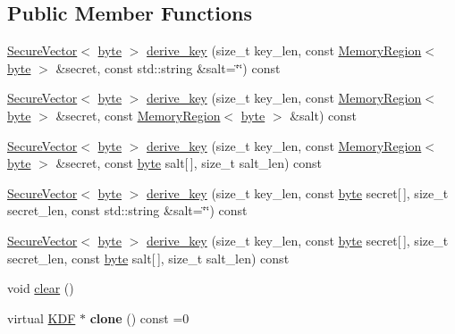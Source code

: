 \subsection*{Public Member Functions}
\begin{DoxyCompactItemize}
\item 
\hyperlink{classBotan_1_1SecureVector}{Secure\-Vector}$<$ \hyperlink{namespaceBotan_a7d793989d801281df48c6b19616b8b84}{byte} $>$ \hyperlink{classBotan_1_1KDF_aa3b8256bf5bd06641936c7509fdcbbd6}{derive\-\_\-key} (size\-\_\-t key\-\_\-len, const \hyperlink{classBotan_1_1MemoryRegion}{Memory\-Region}$<$ \hyperlink{namespaceBotan_a7d793989d801281df48c6b19616b8b84}{byte} $>$ \&secret, const std\-::string \&salt=\char`\"{}\char`\"{}) const 
\item 
\hyperlink{classBotan_1_1SecureVector}{Secure\-Vector}$<$ \hyperlink{namespaceBotan_a7d793989d801281df48c6b19616b8b84}{byte} $>$ \hyperlink{classBotan_1_1KDF_adb6a3e30d795dfe5296c3664c6dc6729}{derive\-\_\-key} (size\-\_\-t key\-\_\-len, const \hyperlink{classBotan_1_1MemoryRegion}{Memory\-Region}$<$ \hyperlink{namespaceBotan_a7d793989d801281df48c6b19616b8b84}{byte} $>$ \&secret, const \hyperlink{classBotan_1_1MemoryRegion}{Memory\-Region}$<$ \hyperlink{namespaceBotan_a7d793989d801281df48c6b19616b8b84}{byte} $>$ \&salt) const 
\item 
\hyperlink{classBotan_1_1SecureVector}{Secure\-Vector}$<$ \hyperlink{namespaceBotan_a7d793989d801281df48c6b19616b8b84}{byte} $>$ \hyperlink{classBotan_1_1KDF_a0c9663079752c839d6d83480c1f2ebf5}{derive\-\_\-key} (size\-\_\-t key\-\_\-len, const \hyperlink{classBotan_1_1MemoryRegion}{Memory\-Region}$<$ \hyperlink{namespaceBotan_a7d793989d801281df48c6b19616b8b84}{byte} $>$ \&secret, const \hyperlink{namespaceBotan_a7d793989d801281df48c6b19616b8b84}{byte} salt\mbox{[}$\,$\mbox{]}, size\-\_\-t salt\-\_\-len) const 
\item 
\hyperlink{classBotan_1_1SecureVector}{Secure\-Vector}$<$ \hyperlink{namespaceBotan_a7d793989d801281df48c6b19616b8b84}{byte} $>$ \hyperlink{classBotan_1_1KDF_ae5f9ef438932d55ba6cd23df12027a6b}{derive\-\_\-key} (size\-\_\-t key\-\_\-len, const \hyperlink{namespaceBotan_a7d793989d801281df48c6b19616b8b84}{byte} secret\mbox{[}$\,$\mbox{]}, size\-\_\-t secret\-\_\-len, const std\-::string \&salt=\char`\"{}\char`\"{}) const 
\item 
\hyperlink{classBotan_1_1SecureVector}{Secure\-Vector}$<$ \hyperlink{namespaceBotan_a7d793989d801281df48c6b19616b8b84}{byte} $>$ \hyperlink{classBotan_1_1KDF_a518fdf4371b88bb2e31623fbe97f9745}{derive\-\_\-key} (size\-\_\-t key\-\_\-len, const \hyperlink{namespaceBotan_a7d793989d801281df48c6b19616b8b84}{byte} secret\mbox{[}$\,$\mbox{]}, size\-\_\-t secret\-\_\-len, const \hyperlink{namespaceBotan_a7d793989d801281df48c6b19616b8b84}{byte} salt\mbox{[}$\,$\mbox{]}, size\-\_\-t salt\-\_\-len) const 
\item 
void \hyperlink{classBotan_1_1KDF_a8c59d113a7329ef98d30bbd097254f62}{clear} ()
\item 
\hypertarget{classBotan_1_1KDF_a31915ff612007a718ac05dba8be56842}{virtual \hyperlink{classBotan_1_1KDF}{K\-D\-F} $\ast$ {\bfseries clone} () const =0}\label{classBotan_1_1KDF_a31915ff612007a718ac05dba8be56842}


\end{DoxyCompactItemize}

